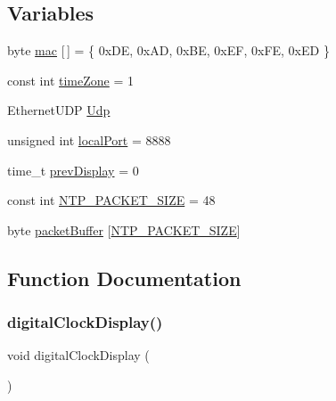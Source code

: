 \subsection*{Variables}
\begin{DoxyCompactItemize}
\item 
byte \hyperlink{_time_n_t_p_8ino_aea3f7775fecafb66a619eb2dcb0357bd}{mac} \mbox{[}$\,$\mbox{]} = \{ 0x\+D\+E, 0x\+A\+D, 0x\+B\+E, 0x\+E\+F, 0x\+F\+E, 0x\+E\+D \}
\item 
const int \hyperlink{_time_n_t_p_8ino_a14e0b2c2e0a918b5dd0706f6cad48191}{time\+Zone} = 1
\item 
Ethernet\+U\+DP \hyperlink{_time_n_t_p_8ino_ac12f4a699dd1eac03facdc1ebf3028d4}{Udp}
\item 
unsigned int \hyperlink{_time_n_t_p_8ino_ac240824c9b35035b41bc24ee200565a2}{local\+Port} = 8888
\item 
time\+\_\+t \hyperlink{_time_n_t_p_8ino_a32a8e1cc3c668b1328fd21df4649182f}{prev\+Display} = 0
\item 
const int \hyperlink{_time_n_t_p_8ino_ae2843b6487d71a38433763495c106346}{N\+T\+P\+\_\+\+P\+A\+C\+K\+E\+T\+\_\+\+S\+I\+ZE} = 48
\item 
byte \hyperlink{_time_n_t_p_8ino_a64bc3d70081888ef346f466f8cffcaa9}{packet\+Buffer} \mbox{[}\hyperlink{_time_n_t_p___e_s_p8266_wi_fi_8ino_ae2843b6487d71a38433763495c106346}{N\+T\+P\+\_\+\+P\+A\+C\+K\+E\+T\+\_\+\+S\+I\+ZE}\mbox{]}
\end{DoxyCompactItemize}


\subsection{Function Documentation}
\mbox{\label{_time_n_t_p_8ino_a01f3a72442d58926459c48afce4746e7}} 
\subsubsection{\texorpdfstring{digital\+Clock\+Display()}{digitalClockDisplay()}}
{\footnotesize\ttfamily void digital\+Clock\+Display (\begin{DoxyParamCaption}{ }\end{DoxyParamCaption})}

\mbox{\label{_time_n_t_p_8ino_a42ab384e77148282f4730ec6c68ac2a3}} 
